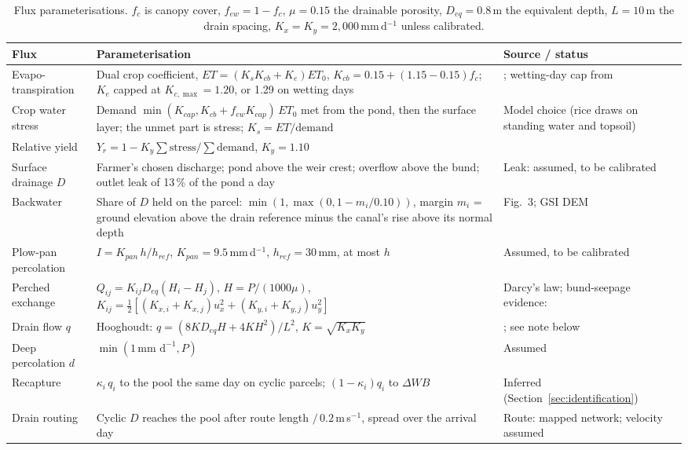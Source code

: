 \documentclass[11pt]{article}
\begin{document}
\begin{table}[H]
\centering\small
\begin{tabular}{L{2.8cm}L{7.4cm}L{4.9cm}}
\toprule
\textbf{Flux} & \textbf{Parameterisation} & \textbf{Source / status} \\ \midrule
Evapo-transpiration & Dual crop coefficient, $ET = (K_s K_{cb} + K_e)ET_0$, $K_{cb} = 0.15 + (1.15 - 0.15) f_c$; $K_e$ capped at $K_{c,\max}=1.20$, or 1.29 on wetting days & \citet{Allen1998FAO56}; wetting-day cap from \citet{Xu2017DualKc} \\
Crop water stress & Demand $\min(K_{cap}, K_{cb} + f_{ew}K_{cap})\,ET_0$ met from the pond, then the surface layer; the unmet part is stress; $K_s = ET/\text{demand}$ & Model choice (rice draws on standing water and topsoil) \\
Relative yield & $Y_r = 1 - K_y\sum\text{stress}/\sum\text{demand}$, $K_y = 1.10$ & \citet{Doorenbos1979} \\
Surface drainage $D$ & Farmer's chosen discharge; pond above the weir crest; overflow above the bund; outlet leak of 13\,\% of the pond a day & Leak: assumed, to be calibrated \\
Backwater & Share of $D$ held on the parcel: $\min(1, \max(0, 1 - m_i/0.10))$, margin $m_i$ = ground elevation above the drain reference minus the canal's rise above its normal depth & \citet{Okura2025WaterBalance} Fig.~3; GSI DEM \\
Plow-pan percolation & $I = K_{pan}\,h/h_{ref}$, $K_{pan} = 9.5$\,mm\,d$^{-1}$, $h_{ref} = 30$\,mm, at most $h$ & Assumed, to be calibrated \\
Perched exchange & $Q_{ij} = K_{ij} D_{eq}(H_i - H_j)$, $H = P/(1000\mu)$, $K_{ij} = \tfrac{1}{2}[(K_{x,i}+K_{x,j})u_x^2 + (K_{y,i}+K_{y,j})u_y^2]$ & Darcy's law; bund-seepage evidence: \citet{Huang2003Bunds, Janssen2007Fluxes, Tsubo2007Toposequence} \\
Drain flow $q$ & Hooghoudt: $q = (8 K D_{eq} H + 4 K H^2)/L^2$, $K = \sqrt{K_x K_y}$ & \citet{Hooghoudt1940}; see note below \\
Deep percolation $d$ & $\min(1\,\text{mm d}^{-1}, P)$ & Assumed \\
Recapture & $\kappa_i\,q_i$ to the pool the same day on cyclic parcels; $(1-\kappa_i)q_i$ to $\Delta WB$ & Inferred (Section~\ref{sec:identification}) \\
Drain routing & Cyclic $D$ reaches the pool after route length $/\,0.2$\,m\,s$^{-1}$, spread over the arrival day & Route: mapped network; velocity assumed \\
\bottomrule
\end{tabular}
\caption{Flux parameterisations. $f_c$ is canopy cover, $f_{ew} = 1 - f_c$, $\mu = 0.15$ the drainable porosity, $D_{eq} = 0.8$\,m the equivalent depth, $L = 10$\,m the drain spacing, $K_x = K_y = 2{,}000$\,mm\,d$^{-1}$ unless calibrated.}
\label{tab:fluxes}
\end{table}
\end{document}
